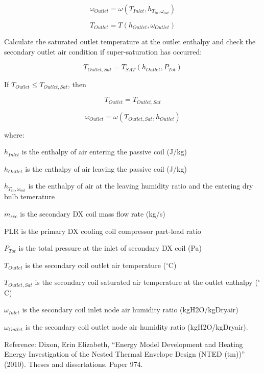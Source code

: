 \begin{equation}
  \omega_{Outlet} = \omega( T_{Inlet}, h_{T_{in},\omega_{out}} )
\end{equation}

\begin{equation}
  T_{Outlet} = T( h_{Outlet}, \omega_{Outlet} )
\end{equation}

Calculate the saturated outlet temperature at the outlet enthalpy and check the secondary outlet air condition if super-saturation has occurred:

\begin{equation}
  T_{Outlet, Sat} = T_{SAT}\left(h_{Outlet}, P_{Tot}\right)
\end{equation}

If \(T_{Outlet} \leq T_{Outlet, Sat}\), then

\begin{equation}
  T_{Outlet} = T_{Outlet, Sat}
\end{equation}

\begin{equation}
  \omega_{Outlet} = \omega\left(T_{Outlet,Sat},h_{Outlet}\right)
\end{equation}

where:

\(h_{Inlet}\) is the enthalpy of air entering the passive coil (J/kg)

\(h_{Outlet}\) is the enthalpy of air leaving the passive coil (J/kg) 

\(h_{T_{in},\omega_{out}}\) is the enthalpy of air at the leaving humidity ratio and the entering dry bulb temerature

\(\dot{m}_{sec}\) is the secondary DX coil mass flow rate (kg/s) 

PLR is the primary DX cooling coil compressor part-load ratio

\(P_{Tot}\) is the total pressure at the inlet of secondary DX coil (Pa)

\(T_{Outlet}\) is the secondary coil outlet air temperature (\(^{\circ}\)C) 

\(T_{Outlet,Sat}\) is the secondary coil saturated air temperature at the outlet enthalpy (\(^{\circ}\)C)

\(\omega_{Inlet}\) is the secondary coil inlet node air humidity ratio (kgH2O/kgDryair) 

\(\omega_{Outlet}\) is the secondary coil outlet node air humidity ratio (kgH2O/kgDryair).

Reference: Dixon, Erin Elizabeth, ``Energy Model Development and Heating Energy Investigation of the Nested Thermal Envelope Design (NTED (tm))'' (2010). Theses and dissertations. Paper 974.

